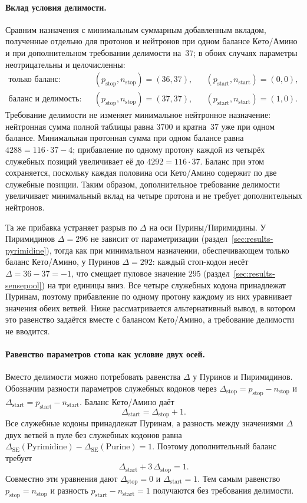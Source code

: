 \documentclass[11pt,a4paper]{article}
\renewcommand{\_}{\origunderscore\allowbreak}
\begin{document}
\paragraph{Вклад условия делимости.}
Сравним назначения с минимальным суммарным добавленным
вкладом, полученные отдельно для протонов и нейтронов при
одном балансе Кето/Амино и при дополнительном требовании
делимости на~$37$; в обоих случаях параметры
неотрицательны и целочисленны:
\[
\begin{aligned}
\text{только баланс:}\quad
&(p_{\text{stop}}, n_{\text{stop}}) = (36, 37), &
&(p_{\text{start}}, n_{\text{start}}) = (0, 0), \\
\text{баланс и делимость:}\quad
&(p_{\text{stop}}, n_{\text{stop}}) = (37, 37), &
&(p_{\text{start}}, n_{\text{start}}) = (1, 0).
\end{aligned}
\]
Требование делимости не изменяет минимальное нейтронное
назначение: нейтронная сумма полной таблицы равна $3700$
и кратна~$37$ уже при одном балансе. Минимальная протонная
сумма при одном балансе равна $4288 = 116 \cdot 37 - 4$;
прибавление по одному протону каждой из четырёх служебных
позиций увеличивает её до $4292 = 116 \cdot 37$. Баланс
при этом сохраняется, поскольку каждая половина оси
Кето/Амино содержит по две служебные позиции. Таким
образом, дополнительное требование делимости увеличивает
минимальный вклад на четыре протона и не требует
дополнительных нейтронов.

Та же прибавка устраняет разрыв по $\Delta$ на оси
Пурины/Пиримидины. У Пиримидинов $\Delta = 296$ не зависит
от параметризации (раздел~\ref{sec:results-pyrimidine}),
тогда как при минимальном назначении, обеспечивающем
только баланс Кето/Амино, у Пуринов $\Delta = 292$:
каждый стоп-кодон несёт $\Delta = 36 - 37 = -1$, что
смещает пуловое значение $295$
(раздел~\ref{sec:results-sensepool}) на три единицы вниз.
Все четыре служебных кодона принадлежат Пуринам, поэтому
прибавление по одному протону каждому из них уравнивает
значения обеих ветвей. Ниже рассматривается альтернативный
вывод, в котором это равенство задаётся вместе с балансом
Кето/Амино, а требование делимости не вводится.

\paragraph{Равенство параметров стопа как условие двух осей.}
Вместо делимости можно потребовать равенства $\Delta$
у Пуринов и Пиримидинов. Обозначим разности параметров
служебных кодонов через
$\Delta_{\text{stop}}=p_{\text{stop}}-n_{\text{stop}}$
и $\Delta_{\text{start}}=p_{\text{start}}-n_{\text{start}}$.
Баланс Кето/Амино даёт
\[
\Delta_{\text{start}}=\Delta_{\text{stop}}+1.
\]
Все служебные кодоны принадлежат Пуринам, а разность
между значениями $\Delta$ двух ветвей в пуле без служебных
кодонов равна
$\Delta_{\mathrm{SE}}(\mathrm{Pyrimidine})-
\Delta_{\mathrm{SE}}(\mathrm{Purine})=1$.
Поэтому дополнительный баланс требует
\[
\Delta_{\text{start}}+3\,\Delta_{\text{stop}}=1.
\]
Совместно эти уравнения дают
$\Delta_{\text{stop}}=0$ и $\Delta_{\text{start}}=1$.
Тем самым равенство $p_{\text{stop}}=n_{\text{stop}}$
и разность $p_{\text{start}}-n_{\text{start}}=1$
получаются без требования делимости.
\end{document}
